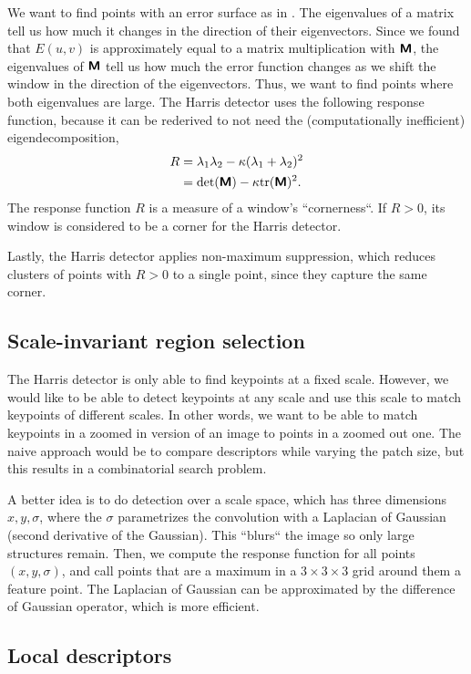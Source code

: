 We want to find points with an error surface as in
. The eigenvalues of a matrix tell us how much
it changes in the direction of their eigenvectors. Since we found that $E(u,v)$
is approximately equal to a matrix multiplication with $\bm{\mathsf{M}}$, the
eigenvalues of $\bm{\mathsf{M}}$ tell us how much the error function changes as we
shift the window in the direction of the eigenvectors. Thus, we want to find
points where both eigenvalues are large. The Harris detector uses the following
response function, because it can be rederived to not need the (computationally
inefficient) eigendecomposition,
\begin{align*}
  R &= \lambda_1\lambda_2 - \kappa (\lambda_1+\lambda_2)^2 \\
  &= \det{\tens{M}}-\kappa \tr{\tens{M}}^2
.\end{align*}
The response function $R$ is a measure of a window's ``cornerness``. If
$R>0$, its window is considered to be a corner for the Harris detector.

Lastly, the Harris detector applies non-maximum suppression, which reduces
clusters of points with $R>0$ to a single point, since they capture the same
corner.

\subsection{Scale-invariant region selection}

The Harris detector is only able to find keypoints at a fixed scale. However,
we would like to be able to detect keypoints at any scale and use this scale to
match keypoints of different scales. In other words, we want to be able to
match keypoints in a zoomed in version of an image to points in a zoomed out
one. The naive approach would be to compare descriptors while varying the patch
size, but this results in a combinatorial search problem.

A better idea is to do detection over a scale space, which has three dimensions
$x,y,\sigma$, where the $\sigma$ parametrizes the convolution with a Laplacian
of Gaussian (second derivative of the Gaussian). This ``blurs`` the image so only
large structures remain. Then, we compute the response function for all points
$(x,y,\sigma)$, and call points that are a maximum in a $3\times 3\times 3$
grid around them a feature point. The Laplacian of Gaussian can be approximated
by the difference of Gaussian operator, which is more efficient.

\subsection{Local descriptors}

